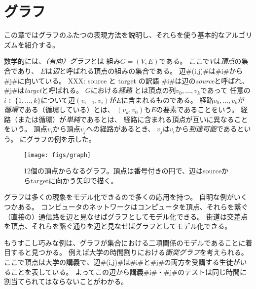 \chapter{グラフ}


この章ではグラフのふたつの表現方法を説明し、それらを使う基本的なアルゴリズムを紹介する。

数学的には、\emph{（有向）グラフ}とは
%
%
組み$G=(V,E)$である。
ここで$V$は\emph{頂点}の集合であり、
%
$E$は\emph{辺}と呼ばれる頂点の組みの集合である。
%
辺#(i,j)#は#i#から#j#に向いている。
%
XXX: source と target の訳語
#i#は辺の\emph{source}と呼ばれ、
#j#は\emph{target}と呼ばれる。
$G$における\emph{経路}%
とは頂点の列$v_0,\ldots,v_k$であって 任意の$i\in\{1,\ldots,k\}$について辺$(v_{i-1},v_{i})$が$E$に含まれるものである。
経路$v_0,\ldots,v_k$が
\emph{循環}である（循環している）とは、
%
$(v_k,v_0)$も$E$の要素であることをいう。
経路（または循環）が\emph{単純}であるとは、
%
経路に含まれる頂点が互いに異なることをいう。
頂点$v_i$から頂点$v_j$への経路があるとき、
$v_j$は$v_i$から\emph{到達可能}であるという。
にグラフの例を示した。

\begin{figure}
  \begin{center}
    \texttt{[image: figs/graph]}
  \end{center}
  \caption{12個の頂点からなるグラフ。頂点は番号付きの円で、辺はsourceからtargetに向かう矢印で描く。}
\end{figure}

グラフは多くの現象をモデル化できるので多くの応用を持つ。
自明な例がいくつかある。
コンピュータのネットワークはコンピュータを頂点、それらを繋ぐ（直接の）通信路を辺と見なせばグラフとしてモデル化できる。
街道は交差点を頂点、それらを繋ぐ通りを辺と見なせばグラフとしてモデル化できる。

もうすこし巧みな例は、グラフが集合における二項関係のモデルであることに着目すると見つかる。
例えば大学の時間割りにおける\emph{衝突グラフ}を考えられる。
%
ここで頂点は大学の講義で、辺#(i,j)#は#i#と#j#の両方を受講する生徒がいることを表している。
よってこの辺から講義#i#・#j#のテストは同じ時間に割当てられてはならないことがわかる。

